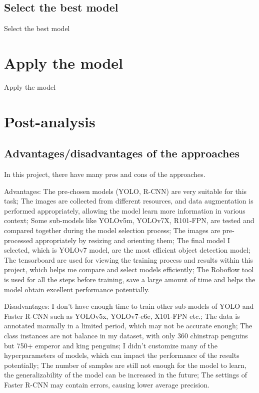\documentclass[runningheads]{llncs}
\begin{document}
\subsection{Select the best model}
Select the best model

\section{Apply the model}
Apply the model

\section{Post-analysis}
\subsection{Advantages/disadvantages of the approaches}
In this project, there have many pros and cons of the approaches.

Advantages: The pre-chosen models (YOLO, R-CNN) are very suitable for this task; The images are collected from different resources, and data augmentation is performed appropriately, allowing the model learn more information in various context; Some sub-models like YOLOv5m, YOLOv7X, R101-FPN, are tested and compared together during the model selection process; The images are pre-processed appropriately by resizing and orienting them; The final model I selected, which is YOLOv7 model, are the most efficient object detection model; The tensorboard are used for viewing the training process and results within this project, which helps me compare and select models efficiently; The Roboflow tool is used for all the steps before training, save a large amount of time and helps the model obtain excellent performance potentially. 

Disadvantages: I don't have enough time to train other sub-models of YOLO and Faster R-CNN such as YOLOv5x, YOLOv7-e6e, X101-FPN etc.; The data is annotated manually in a limited period, which may not be accurate enough; The class instances are not balance in my dataset, with only 360 chinstrap penguins but 750+ emperor and king penguins; I didn't customize many of the hyperparameters of models, which can impact the performance of the results potentially; The number of samples are still not enough for the model to learn, the generalizability of the model can be increased in the future; The settings of Faster R-CNN may contain errors, causing lower average precision.
\end{document}
